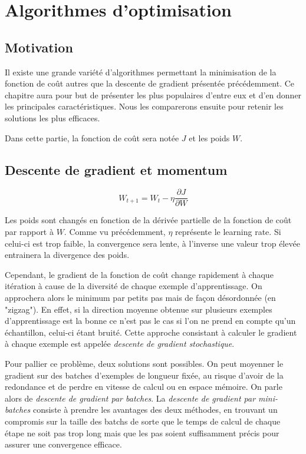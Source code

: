 \chapter{Algorithmes d'optimisation}
\section{Motivation}
Il existe une grande variété d'algorithmes permettant la minimisation de la fonction de coût autres que la descente de gradient présentée précédemment. Ce chapitre aura pour but de présenter les plus populaires d'entre eux et d'en donner les principales caractéristiques. Nous les comparerons ensuite pour retenir les solutions les plus efficaces.

Dans cette partie, la fonction de coût sera notée $J$ et les poids $W$.

\section{Descente de gradient et momentum}
\begin{equation}
W_{t+1} = W_t - \eta\frac{\partial J}{\partial W}
\end{equation} 

Les poids sont changés en fonction de la dérivée partielle de la fonction de coût par rapport à $W$. Comme vu précédemment, $\eta$ représente le learning rate. Si celui-ci est trop faible, la convergence sera lente, à l'inverse une valeur trop élevée entrainera la divergence des poids.

Cependant, le gradient de la fonction de coût change rapidement à chaque itération à cause de la diversité de chaque exemple d'apprentissage. On approchera alors le minimum par petits pas mais de façon désordonnée (en "zigzag"). En effet, si la direction moyenne obtenue sur plusieurs exemples d'apprentissage est la bonne ce n'est pas le cas si l'on ne prend en compte qu'un échantillon, celui-ci étant bruité. Cette approche consistant à calculer le gradient à chaque exemple est appelée \textit{descente de gradient stochastique}.

Pour pallier ce problème, deux solutions sont possibles. On peut moyenner le gradient sur des batches d'exemples de longueur fixée, au risque d'avoir de la redondance et de perdre en vitesse de calcul ou en espace mémoire. On parle alors de \textit{descente de gradient par batches}. La \textit{descente de gradient par mini-batches} consiste à prendre les avantages des deux méthodes, en trouvant un compromis sur la taille des batchs de sorte que le temps de calcul de chaque étape ne soit pas trop long mais que les pas soient suffisamment précis pour assurer une convergence efficace.


